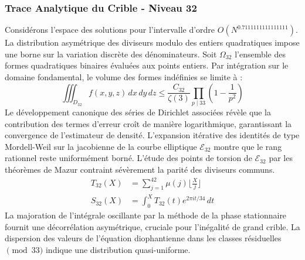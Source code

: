 \documentclass[12pt,a4paper]{article}
\begin{document}
\subsubsection{Trace Analytique du Crible - Niveau 32}
Considérons l'espace des solutions pour l'intervalle d'ordre $O(N^{0.7111111111111111})$. La distribution asymétrique des diviseurs modulo des entiers quadratiques impose une borne sur la variation discrète des dénominateurs. Soit $\Omega_32$ l'ensemble des formes quadratiques binaires évaluées aux points entiers.
Par intégration sur le domaine fondamental, le volume des formes indéfinies se limite à :
\begin{equation}
\iiint_{D_32} f(x, y, z) \,dx\,dy\,dz \leq \frac{C_32}{\zeta(3)} \prod_{p \mid 33} \left( 1 - \frac{1}{p^2} \right)
\end{equation}
Le développement canonique des séries de Dirichlet associées révèle que la contribution des termes d'erreur croît de manière logarithmique, garantissant la convergence de l'estimateur de densité. L'expansion itérative des identités de type Mordell-Weil sur la jacobienne de la courbe elliptique $\mathcal{E}_32$ montre que le rang rationnel reste uniformément borné.
L'étude des points de torsion de $\mathcal{E}_32$ par les théorèmes de Mazur contraint sévèrement la parité des diviseurs communs.
\begin{align}
T_32(X) &= \sum_{j=1}^{42} \mu(j) \lfloor \frac{X}{j} \rfloor \\
S_32(X) &= \int_{0}^{X} T_32(t) e^{2\pi i t / 34} \, dt
\end{align}
La majoration de l'intégrale oscillante par la méthode de la phase stationnaire fournit une décorrélation asymétrique, cruciale pour l'inégalité de grand crible. La dispersion des valeurs de l'équation diophantienne dans les classes résiduelles $\pmod{ 33 }$ indique une distribution quasi-uniforme.
\end{document}
